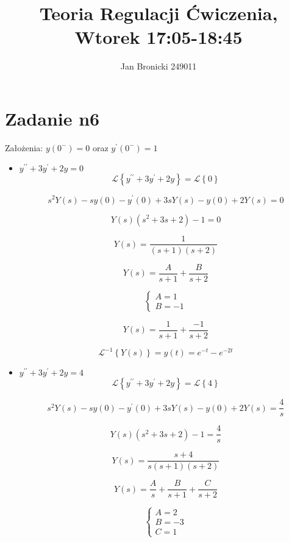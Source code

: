 \documentclass{article}
\title{Teoria Regulacji Ćwiczenia, Wtorek 17:05-18:45}
\author{Jan Bronicki 249011 }
\date{}
\begin{document}
\maketitle

\section*{Zadanie n6}

Założenia: $y(0^{-})=0$ oraz $ y^{\prime}(0^{-})=1$

\begin{itemize}

    \item $y^{\prime \prime}+3y^{\prime}+2y=0$
        $$\mathcal{L}\left\{y^{\prime \prime}+3y^{\prime}+2y\right\}=\mathcal{L}\left\{0\right\}$$

        $$s^{2} Y(s) -s y(0) -y^{\prime}(0) +3s Y(s) - y(0) +2 Y(s)=0$$

        $$Y(s) \left( s^{2}+3s+2 \right) -1=0$$

        $$Y(s)=\frac{1}{(s+1)(s+2)}$$

        $$Y(s)=\frac{A}{s+1}+\frac{B}{s+2}$$

        \[\begin{cases}
            A=1
            \\
            B=-1
        \end{cases}\]

        $$Y(s)=\frac{1}{s+1}+\frac{-1}{s+2}$$

        $$\mathcal{L}^{-1}\left\{Y(s)\right\}=y(t)=e^{-t}-e^{-2t}$$


\newpage
    \item $y^{\prime \prime}+3y^{\prime}+2y=4$
        $$\mathcal{L}\left\{y^{\prime \prime}+3y^{\prime}+2y\right\}=\mathcal{L}\left\{4\right\}$$

        $$s^{2} Y(s) -s y(0) -y^{\prime}(0) +3s Y(s) - y(0) +2 Y(s)=\frac{4}{s}$$

        $$Y(s) \left( s^{2}+3s+2 \right) -1=\frac{4}{s}$$

        $$Y(s)=\frac{s+4}{s(s+1)(s+2)}$$

        $$Y(s)=\frac{A}{s}+\frac{B}{s+1}+\frac{C}{s+2}$$

        \[\begin{cases}
            A=2
            \\
            B=-3
            \\
            C=1
        \end{cases}\]


\end{itemize}
\end{document}
